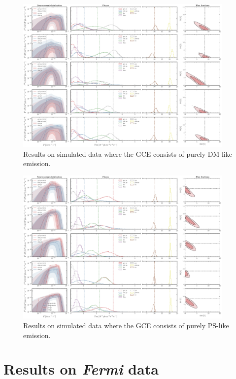 \documentclass[prd,aps,10pt,nofootinbib,twocolumn,superscriptaddress,preprintnumbers,balancelastpage,longbibliography]{revtex4-1}
\begin{document}
%
\begin{figure}
    \centering
    \includegraphics[width=0.95\textwidth]{plots/sim_sbi_dm.pdf}
    \caption{Results on simulated data where the GCE consists of purely DM-like emission.}
    \label{fig:sim_sbi_dm}
\end{figure}
%

%
\begin{figure}
    \centering
    \includegraphics[width=0.95\textwidth]{plots/sim_sbi_ps.pdf}
    \caption{Results on simulated data where the GCE consists of purely PS-like emission.}
    \label{fig:sim_sbi_ps}
\end{figure}
%

\section{Results on \emph{Fermi} data}
\label{sec:data}
\end{document}
